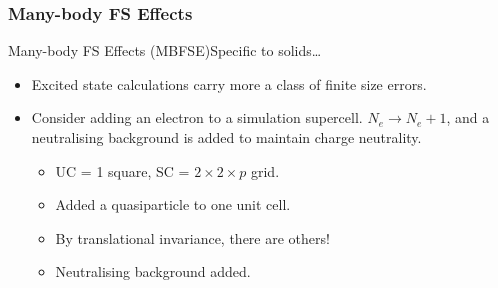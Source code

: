 \documentclass[12pt, pdf, hyperref={draft}, usenames, dvipsnames,
aspectratio=169]{beamer}
\newcommand{\red}[1]{{\bf\color{LancsRed}{#1}}}
\begin{document}
\subsubsection{Many-body FS Effects}\label{subsub:mb_fs_effects}

\begin{frame}{Many-body FS Effects (MBFSE)}{Specific to solids\ldots}

\begin{itemize}

  \item Excited state calculations carry more a \red{far more potent} class of
  finite size errors.

  \item Consider adding an electron to a simulation supercell. $N_e \rightarrow
  N_e + 1$, and a neutralising background is added to maintain charge
  neutrality.

\begin{minipage}[t]{0.4\textwidth}


\end{minipage}%
\hfill
\begin{minipage}[t]{0.5\textwidth}
\vspace{-4.0cm}
\begin{itemize}

  \item UC = 1 square, SC = $2\times2\times p$ grid. \pause{}

  \item Added a quasiparticle to one unit cell. \pause{}

  \item By translational invariance, there are others! \pause{}

  \item Neutralising background added.

\end{itemize}
\end{minipage}%
\end{itemize}
\end{frame}
\end{document}
